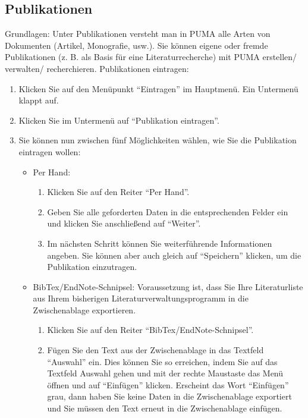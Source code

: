 \documentclass[a4paper,11pt,twoside]{scrbook}
\begin{document}
\subsection{Publikationen}%
Grundlagen:
\newline
Unter Publikationen versteht man in PUMA alle Arten von Dokumenten (Artikel, Monografie, usw.). Sie können eigene oder fremde Publikationen (z. B. als Basis für eine Literaturrecherche) mit PUMA erstellen/ verwalten/ recherchieren. 
\newline
\newline
Publikationen eintragen:
\begin{enumerate}
    \item Klicken Sie auf den Menüpunkt \enquote{Eintragen} im Hauptmenü. Ein Untermenü klappt auf.
    \item Klicken Sie im Untermenü auf \enquote{Publikation eintragen}.
    \item Sie können nun zwischen fünf Möglichkeiten wählen, wie Sie die Publikation eintragen wollen:
    \begin{itemize}
        \item Per Hand:
        \begin{enumerate}
            \item Klicken Sie auf den Reiter \enquote{Per Hand}.
            \item Geben Sie alle geforderten Daten in die entsprechenden Felder ein und klicken Sie anschließend auf \enquote{Weiter}. 
            \item Im nächsten Schritt können Sie weiterführende Informationen angeben. Sie können aber auch gleich auf \enquote{Speichern} klicken, um die Publikation einzutragen.
        \end{enumerate}
        \item BibTex/EndNote-Schnipsel:
        \newline
        Voraussetzung ist, dass Sie Ihre Literaturliste aus Ihrem bisherigen Literaturverwaltungsprogramm in die Zwischenablage exportieren.
        \begin{enumerate}
            \item Klicken Sie auf den Reiter \enquote{BibTex/EndNote-Schnipsel}.
            \item Fügen Sie den Text aus der Zwischenablage in das Textfeld \enquote{Auswahl} ein. Dies können Sie so erreichen, indem Sie auf das Textfeld Auswahl gehen und mit der rechte Maustaste das Menü öffnen und auf \enquote{Einfügen} klicken. Erscheint das Wort \enquote{Einfügen} grau, dann haben Sie keine Daten in die Zwischenablage exportiert und Sie müssen den Text erneut in die Zwischenablage einfügen.

\end{enumerate}
\end{itemize}
\end{enumerate}
\end{document}
